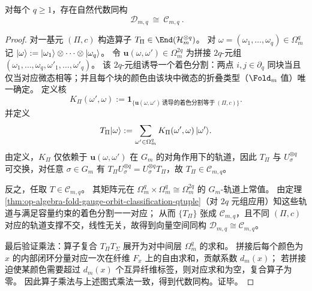 \begin{theorem}[有色分割轨道代数与复制中心化代数的同构]\label{thm:op-algebra-replication-centralizer-colored-partition-orbit-algebra}
对每个 \(q\ge 1\)，存在自然代数同构
\[
\boxed{\;
\mathcal D_{m,q}\ \cong\ \mathcal C_{m,q}\ }.
\]
\end{theorem}
\begin{proof}
对一基元 \((\Pi,c)\) 构造算子 \(T_{\Pi}\in\End(\mathcal H_m^{\otimes q})\)。
对 \(\omega=(\omega_1,\dots,\omega_q)\in\Omega_m^q\) 记 \(\lvert \omega\rangle:=\lvert \omega_1\rangle\otimes\cdots\otimes\lvert \omega_q\rangle\)。
令
\(
\mathbf u(\omega,\omega')\in\Omega_m^{2q}
\)
为拼接 \(2q\)-元组
\(
(\omega_1,\dots,\omega_q,\omega'_1,\dots,\omega'_q)
\)。
该 \(2q\)-元组诱导一个着色分割：两点 \(i,j\in\partial_q\) 同块当且仅当对应微态相等；并且每个块的颜色由该块中微态的折叠类型（\(\Fold_m\) 值）唯一确定。
定义核
\[
K_{\Pi}(\omega',\omega):=\mathbf 1_{\{\mathbf u(\omega,\omega')\ \text{诱导的着色分割等于}\ (\Pi,c)\}}.
\]
并定义
\[
T_{\Pi}\lvert \omega\rangle:=\sum_{\omega'\in\Omega_m^q}K_{\Pi}(\omega',\omega)\,\lvert \omega'\rangle.
\]
由定义，\(K_\Pi\) 仅依赖于 \(\mathbf u(\omega,\omega')\) 在 \(G_m\) 的对角作用下的轨道，因此 \(T_\Pi\) 与 \(U_\sigma^{\otimes q}\) 可交换，对任意 \(\sigma\in G_m\) 有
\(
T_\Pi U_\sigma^{\otimes q}=U_\sigma^{\otimes q}T_\Pi
\)，故 \(T_\Pi\in\mathcal C_{m,q}\)。
\par
反之，任取 \(T\in\mathcal C_{m,q}\)。
其矩阵元在 \(\Omega_m^q\times \Omega_m^q\cong \Omega_m^{2q}\) 的 \(G_m\)-轨道上常值。
由定理 \ref{thm:op-algebra-fold-gauge-orbit-classification-qtuple}（对 \(2q\) 元组应用）知这些轨道与满足容量约束的着色分割一一对应；
从而 \(\{T_\Pi\}\) 张成 \(\mathcal C_{m,q}\)，且不同 \((\Pi,c)\) 对应的轨道支撑不交，线性无关，故得到向量空间同构 \(\mathcal D_{m,q}\cong\mathcal C_{m,q}\)。
\par
最后验证乘法：算子复合 \(T_\Pi T_\Sigma\) 展开为对中间层 \(\Omega_m^q\) 的求和。
拼接后每个颜色为 \(x\) 的内部闭环分量对应一次在纤维 \(F_x\) 上的自由求和，贡献系数 \(d_m(x)\)；
若拼接迫使某颜色需要超过 \(d_m(x)\) 个互异纤维标签，则对应求和为空，复合算子为零。
因此算子乘法与上述图式乘法一致，得到代数同构。证毕。
\end{proof}


